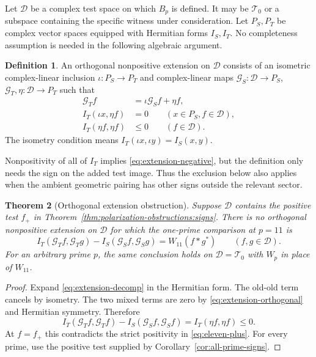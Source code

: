 \documentclass[11pt,letterpaper]{article}
\newtheorem{theorem}{Theorem}[section]
\theoremstyle{definition}
\newtheorem{definition}[theorem]{Definition}
\theoremstyle{remark}
\newcommand{\T}{\mathcal T}
\begin{document}
Let $\mathcal D$ be a complex test space on which $B_p$ is
defined. It may be $\T_0$ or a subspace containing the
specific witness under consideration. Let $P_S,P_T$ be
complex vector spaces equipped with Hermitian forms
$I_S,I_T$. No completeness assumption is needed in the
following algebraic argument.

\begin{definition}
\label{def:polarization-obstructions:extension}
An orthogonal nonpositive extension on $\mathcal D$ consists
of an isometric complex-linear inclusion
$\iota:P_S\to P_T$ and complex-linear maps
$\mathcal G_S:\mathcal D\to P_S$,
$\mathcal G_T,\eta:\mathcal D\to P_T$ such that
\begin{align}
 \mathcal G_Tf&=\iota\mathcal G_Sf+\eta f,
 \label{eq:extension-decomp}\\
 I_T(\iota x,\eta f)&=0\qquad(x\in P_S,f\in\mathcal D),
 \label{eq:extension-orthogonal}\\
 I_T(\eta f,\eta f)&\leq0\qquad(f\in\mathcal D).
 \label{eq:extension-negative}
\end{align}
The isometry condition means
$I_T(\iota x,\iota y)=I_S(x,y)$.
\end{definition}

Nonpositivity of all of $I_T$ implies
\eqref{eq:extension-negative}, but the definition only needs
the sign on the added test image. Thus the exclusion below
also applies when the ambient geometric pairing has other
signs outside the relevant sector.

\begin{theorem}[Orthogonal extension obstruction]
\label{thm:polarization-obstructions:extension}
Suppose $\mathcal D$ contains the positive test $f_+$ in
Theorem~\ref{thm:polarization-obstructions:signs}. There is
no orthogonal nonpositive extension on $\mathcal D$ for
which the one-prime comparison at $p=11$ is
\begin{equation}
 I_T(\mathcal G_Tf,\mathcal G_Tg)-I_S(\mathcal G_Sf,\mathcal G_Sg)
 =W_{11}(f*g^*)\qquad(f,g\in\mathcal D).
 \label{eq:target-increment}
\end{equation}
For an arbitrary prime $p$, the same conclusion holds on
$\mathcal D=\T_0$ with $W_p$ in place of $W_{11}$.
\end{theorem}
\begin{proof}
Expand \eqref{eq:extension-decomp} in the Hermitian form.
The old-old term cancels by isometry. The two mixed terms
are zero by \eqref{eq:extension-orthogonal} and Hermitian
symmetry. Therefore
\[
 I_T(\mathcal G_Tf,\mathcal G_Tf)-I_S(\mathcal G_Sf,\mathcal G_Sf)
 =I_T(\eta f,\eta f)\leq0.
\]
At $f=f_+$ this contradicts the strict positivity in
\eqref{eq:eleven-plus}. For every prime, use the positive
test supplied by Corollary~\ref{cor:all-prime-signs}.
\end{proof}
\end{document}
